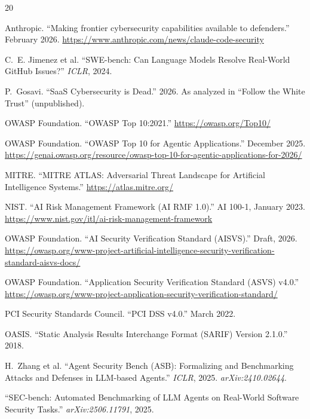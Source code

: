 \documentclass[11pt,twocolumn]{article}
\begin{document}
\begin{thebibliography}{20}

Anthropic. ``Making frontier cybersecurity capabilities available to defenders.'' February 2026. \url{https://www.anthropic.com/news/claude-code-security}

C.~E. Jimenez et al. ``SWE-bench: Can Language Models Resolve Real-World GitHub Issues?'' \textit{ICLR}, 2024.

P.~Gosavi. ``SaaS Cybersecurity is Dead.'' 2026. As analyzed in ``Follow the White Trust'' (unpublished).

OWASP Foundation. ``OWASP Top 10:2021.'' \url{https://owasp.org/Top10/}

OWASP Foundation. ``OWASP Top 10 for Agentic Applications.'' December 2025. \url{https://genai.owasp.org/resource/owasp-top-10-for-agentic-applications-for-2026/}

MITRE. ``MITRE ATLAS: Adversarial Threat Landscape for Artificial Intelligence Systems.'' \url{https://atlas.mitre.org/}

NIST. ``AI Risk Management Framework (AI RMF 1.0).'' AI 100-1, January 2023. \url{https://www.nist.gov/itl/ai-risk-management-framework}

OWASP Foundation. ``AI Security Verification Standard (AISVS).'' Draft, 2026. \url{https://owasp.org/www-project-artificial-intelligence-security-verification-standard-aisvs-docs/}

OWASP Foundation. ``Application Security Verification Standard (ASVS) v4.0.'' \url{https://owasp.org/www-project-application-security-verification-standard/}

PCI Security Standards Council. ``PCI DSS v4.0.'' March 2022.

OASIS. ``Static Analysis Results Interchange Format (SARIF) Version 2.1.0.'' 2018.

H.~Zhang et al. ``Agent Security Bench (ASB): Formalizing and Benchmarking Attacks and Defenses in LLM-based Agents.'' \textit{ICLR}, 2025. \textit{arXiv:2410.02644}.

``SEC-bench: Automated Benchmarking of LLM Agents on Real-World Software Security Tasks.'' \textit{arXiv:2506.11791}, 2025.


\end{thebibliography}
\end{document}
